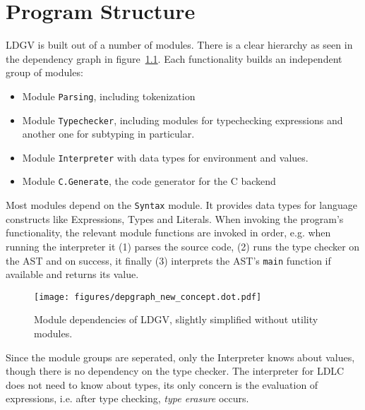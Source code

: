\chapter{Program Structure}\label{chap:Program Structure}

LDGV is built out of a number of modules. There is a clear hierarchy as seen in the dependency graph in figure~\ref{fig:dependency-graph}. Each functionality builds an independent group of modules:

\begin{itemize}
 \item Module \texttt{Parsing}, including tokenization
 \item Module \texttt{Typechecker}, including modules for typechecking expressions and another one for subtyping in particular.
 \item Module \texttt{Interpreter} with data types for environment and values.
 \item Module \texttt{C.Generate}, the code generator for the C backend
\end{itemize}

Most modules depend on the \texttt{Syntax} module. It provides data types for language constructs like Expressions, Types and Literals. When invoking the program's functionality, the relevant module functions are invoked in order, e.g. when running the interpreter it (1) parses the source code, (2) runs the type checker on the AST and on success, it finally (3) interprets the AST's \texttt{main} function if available and returns its value.

\begin{figure}
 \centering
 \texttt{[image: figures/depgraph\_new\_concept.dot.pdf]}
 \caption{Module dependencies of LDGV, slightly simplified without utility modules.}
 \label{fig:dependency-graph}
\end{figure}

Since the module groups are seperated, only the Interpreter knows about values, though there is no dependency on the type checker. The interpreter for LDLC does not need to know about types, its only concern is the evaluation of expressions, i.e. after type checking, \emph{type erasure} occurs. 
